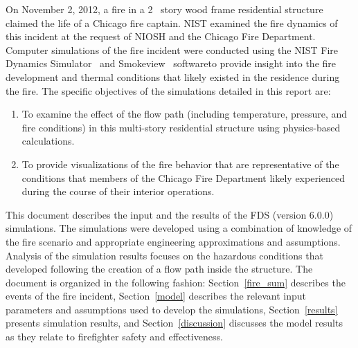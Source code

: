\documentclass[12pt,oneside]{book}
\begin{document}
On November 2, 2012, a fire in a 2~ story wood frame residential structure claimed the life of a Chicago fire captain. NIST examined the fire dynamics of this incident at the request of NIOSH and the Chicago Fire Department. Computer simulations of the fire incident were conducted using the NIST Fire Dynamics Simulator~\cite{FDS_Users_Guide} and Smokeview~\cite{Smokeview_Users_Guide}  softwareto provide insight into the fire development and thermal conditions that likely existed in the residence during the fire. The specific objectives of the simulations detailed in this report are: 
\begin{enumerate}
\item To examine the effect of the flow path (including temperature, pressure, and fire conditions) in this multi-story residential structure using physics-based calculations.
\item To provide visualizations of the fire behavior that are representative of the conditions that members of the Chicago Fire Department likely experienced during the course of their interior operations.
\end{enumerate}
This document describes the input and the results of the FDS (version 6.0.0) simulations. The simulations were developed using a combination of knowledge of the fire scenario and appropriate engineering approximations and assumptions. Analysis of the simulation results focuses on the hazardous conditions that developed following the creation of a flow path inside the structure.  The document is organized in the following fashion:  Section~\ref{fire_sum} describes the events of the fire incident, Section~\ref{model} describes the relevant input parameters and assumptions used to develop the simulations, Section~\ref{results} presents simulation results, and Section~\ref{discussion} discusses the model results as they relate to firefighter safety and effectiveness. 
\end{document}
